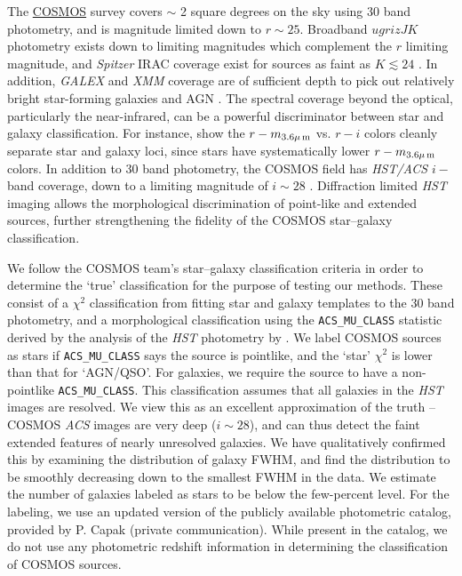 \documentclass[12pt,preprint]{aastex}
\begin{document}
The \href{http://cosmos.astro.caltech.edu/}{COSMOS} survey 
\citep{scoville07a} covers $\sim$ 2 square degrees on
the sky using 30 band photometry, and is magnitude limited down to $r
\sim 25$.  Broadband $ugrizJK$ photometry exists down to limiting
magnitudes which complement the $r$ limiting magnitude, and {\it
  Spitzer} IRAC coverage exist for sources as faint as $K\lesssim24$ 
  \citep{capak07,sanders07,taniguchi07}.
In addition, {\it GALEX} and {\it XMM} coverage are of sufficient
depth to pick out relatively bright star-forming galaxies and AGN 
\citep{hasinger07,zamojski07}.
The spectral coverage beyond the optical, particularly the
near-infrared, can be a powerful discriminator between star and
galaxy classification.  For instance, \citet{ilbert09} show the
$r-m_{\rm 3.6\mu\,m}$ vs. $r-i$ colors cleanly separate star and
galaxy loci, since stars have systematically lower $r-m_{\rm
  3.6\mu\,m}$ colors.  In addition to 30 band photometry, the COSMOS
field has \textit{HST/ACS} $i-$band coverage, down to a limiting
magnitude of $i\sim28$ \citep{koekemoer07,scoville07b}.  Diffraction
limited \textit{HST} imaging allows the morphological discrimination
of point-like and extended sources, further strengthening the fidelity
of the COSMOS star--galaxy classification.

We follow the COSMOS team's star--galaxy classification criteria 
in order to determine the `true' classification for the purpose of 
testing our methods.  These consist of a $\chi^2$ classification 
from fitting star and galaxy templates to the 30 band photometry, 
and a morphological classification using the 
{\tt ACS\_MU\_CLASS} statistic derived by the analysis of the 
\textit{HST} photometry by \citet{scarlata07}.   We label COSMOS
sources as stars if {\tt ACS\_MU\_CLASS} says the source is pointlike, 
and the `star' $\chi^2$ is lower than that for `AGN/QSO'.  For galaxies, 
we require the source to have a non-pointlike {\tt ACS\_MU\_CLASS}.  
This classification assumes that all galaxies in the \textit{HST} images 
are resolved.  We view this as an excellent approximation of the truth 
-- COSMOS \textit{ACS} images are very deep ($i\sim28$), and can thus detect 
the faint extended features of nearly unresolved galaxies.  We have 
qualitatively confirmed this by examining the distribution of galaxy 
FWHM, and find the distribution to be smoothly decreasing down to 
the smallest FWHM in the data.  We estimate the number of galaxies 
labeled as stars to be below the few-percent level.  For the labeling, we 
use an updated version of the publicly available photometric catalog, 
provided by P. Capak (private communication).  While present in the catalog, 
we do not use any photometric redshift information in determining the 
classification of COSMOS sources.
\end{document}
